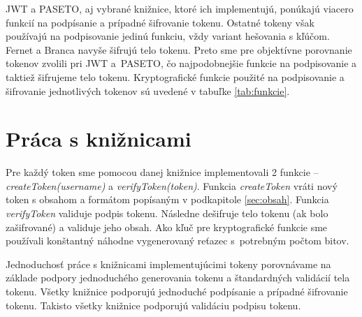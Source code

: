 JWT a PASETO, aj vybrané knižnice, ktoré ich implementujú, ponúkajú viacero funkcií na podpísanie a prípadné šifrovanie tokenu. Ostatné tokeny však používajú na podpisovanie jedinú funkciu, vždy variant hešovania s kľúčom. Fernet a Branca navyše šifrujú telo tokenu. Preto sme pre objektívne porovnanie tokenov zvolili pri JWT a~PASETO, čo najpodobnejšie funkcie na podpisovanie a taktiež šifrujeme telo tokenu. Kryptografické funkcie použité na podpisovanie a šifrovanie jednotlivých tokenov sú uvedené v tabuľke \ref{tab:funkcie}.

\begin{table}[H]
  \begin{center}
    \caption{Kryptografické funkcie na podpisovanie a šifrovanie tokenov}
    \label{tab:funkcie} %

  \end{center}
\end{table}

\section{Práca s knižnicami}

Pre každý token sme pomocou danej knižnice implementovali 2 funkcie -- \textit{createToken(username)} a \textit{verifyToken(token)}. Funkcia \textit{createToken} vráti nový token s obsahom a formátom popísaným v podkapitole \ref{sec:obsah}. Funkcia \textit{verifyToken} validuje podpis tokenu. Následne dešifruje telo tokenu (ak bolo zašifrované) a validuje jeho obsah. Ako kľuč pre kryptografické funkcie sme používali konštantný náhodne vygenerovaný reťazec s~potrebným počtom bitov.

Jednoduchosť práce s knižnicami implementujúcimi tokeny porovnávame na základe podpory jednoduchého generovania tokenu a štandardných validácií tela tokenu.
Všetky knižnice podporujú jednoduché podpísanie a prípadné šifrovanie tokenu. Takisto všetky knižnice podporujú validáciu podpisu tokenu. 

